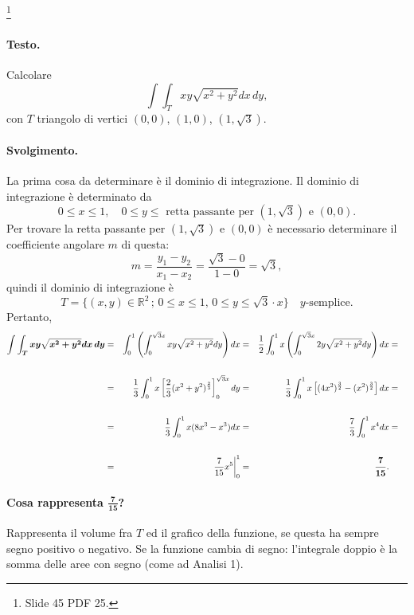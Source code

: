 \begin{example}\footnote{Slide 45 PDF 25.}
	\paragraph{Testo.} Calcolare
	\begin{equation*}
		\int\int_T xy\sqrt{x^2+y^2} dx\, dy,
	\end{equation*}
	con $T$ triangolo di vertici $(0,0)$, $(1,0)$, $(1, \sqrt{3})$.
	\paragraph{Svolgimento.} La prima cosa da determinare è il dominio di integrazione. Il dominio di integrazione è determinato da
	\begin{equation*}
		0\leq x\leq 1,\quad 0\leq y\leq \text{ retta passante per } (1,\sqrt{3}) \text{ e } (0,0).
	\end{equation*}
	Per trovare la retta passante per $(1,\sqrt{3})$ e $(0,0)$ è necessario determinare il coefficiente angolare $m$ di questa:
	\begin{equation*}
		m = \frac{y_1-y_2}{x_1-x_2} = \frac{\sqrt{3}-0}{1-0} = \sqrt{3},
	\end{equation*}
	quindi il dominio di integrazione è
	\begin{equation*}
		T = \{(x,y)\in\mathbb{R}^2\,;\, 0\leq x\leq 1,\, 0\leq y\leq \sqrt{3}\cdot x\}\quad y\text{-semplice}.
	\end{equation*}
	Pertanto,
	\begin{equation*}
		\begin{aligned}
			\boldsymbol{\int\int_T xy\sqrt{x^2+y^2} dx\, dy} &=& \int_0^1\left(\int_0^{\sqrt{3}x}xy\sqrt{x^2 + y^2}dy\right) dx &=& \frac{1}{2}\int_0^1 x \left(\int_0^{\sqrt{3}x} 2y\sqrt{x^2 + y^2}dy\right) dx &=&\\ \\
			&=& \frac{1}{3} \int_0^1 x \left[\frac{2}{3}(x^2+y^2)^{\frac{2}{3}}\right]_0^{\sqrt{3}x} dy &=& \frac{1}{3} \int_0^1 x \left[(4x^2)^{\frac{3}{2}} - (x^2)^{\frac{3}{2}} \right] dx &=&\\\\
			&=& \frac{1}{3}\int_0^1 x (8x^3 - x^3) dx &=& \frac{7}{3}\int_0^1 x^4  dx &=&\\\\
			&=& \left.\frac{7}{15}x^5\right\rvert_{0}^{1} &=& \boldsymbol{\frac{7}{15}}.
		\end{aligned}
	\end{equation*}
	\paragraph{Cosa rappresenta $ \boldsymbol{\frac{7}{15}}$?} Rappresenta il volume fra $T$ ed il grafico della funzione, se questa ha sempre segno positivo o negativo. Se la funzione cambia di segno: l'integrale doppio è la somma delle aree con segno (come ad Analisi 1).
\end{example}

